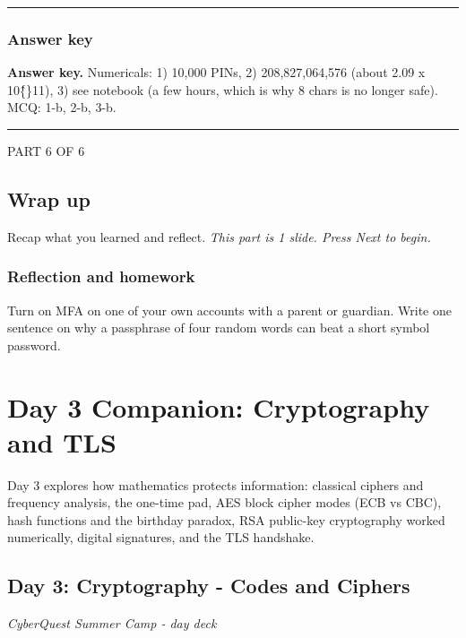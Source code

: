 \documentclass[12pt,openany]{book}
\begin{document}
\medskip\noindent\rule{\linewidth}{0.4pt}\medskip

\medskip

\subsection*{Answer key}


\textbf{Answer key.} Numericals: 1) 10,000 PINs, 2) 208,827,064,576 (about 2.09 x 10\^\{\}11), 3) see notebook (a few hours, which is why 8 chars is no longer safe). MCQ: 1-b, 2-b, 3-b.


\medskip\noindent\rule{\linewidth}{0.4pt}\medskip

\medskip

\vspace{4pt}\noindent\textsc{PART 6 OF 6}


\section*{Wrap up}

Recap what you learned and reflect.
{\small\itshape\color{gray}This part is 1 slide. Press Next to begin.}

\medskip

\subsection*{Reflection and homework}


Turn on MFA on one of your own accounts with a parent or guardian. Write one sentence on why a passphrase of four random words can beat a short symbol password.

\medskip

\chapter{Day 3 Companion: Cryptography and TLS}
Day 3 explores how mathematics protects information: classical ciphers and frequency analysis, the one-time pad, AES block cipher modes (ECB vs CBC), hash functions and the birthday paradox, RSA public-key cryptography worked numerically, digital signatures, and the TLS handshake.

\section*{Day 3: Cryptography - Codes and Ciphers}
{\small\itshape\color{gray}CyberQuest Summer Camp - day deck}
\end{document}
